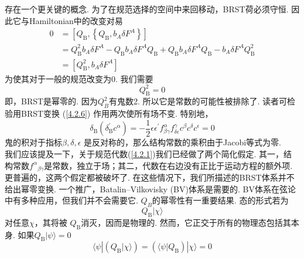 存在一个更关键的概念. 为了在规范选择的空间中来回移动，BRST荷必须守恒. 因此它与Hamiltonian中的改变对易                                                                                                                                                                                                                                                                                                                                         
\begin{equation}
\begin{aligned}
0 &=\left[Q_{\mathrm{B}},\left\{Q_{\mathrm{B}}, b_{A} \delta F^{A}\right\}\right] \\
&=Q_{\mathrm{B}}^{2} b_{A} \delta F^{A}-Q_{\mathrm{B}} b_{A} \delta F^{A} Q_{\mathrm{B}}+Q_{\mathrm{B}} b_{A} \delta F^{A} Q_{\mathrm{B}}-b_{A} \delta F^{A} Q_{\mathrm{B}}^{2} \\
&=\left[Q_{\mathrm{B}}^{2}, b_{A} \delta F^{A}\right]
\end{aligned}
\end{equation}
为使其对于一般的规范改变为0. 我们需要
\begin{equation}
Q_{\mathrm{B}}^{2}=0
\end{equation}
即，BRST是幂零的. 因为$Q_B^2$有鬼数2. 所以它是常数的可能性被排除了. 读者可检验用BRST变换 (\ref{4.2.6}) 作用两次使所有场不变. 特别地，                                                                         
\begin{equation}
\delta_{\mathrm{B}}\left(\delta_{\mathrm{B}}^{\prime} c^{\alpha}\right)=-\frac{1}{2} \epsilon \epsilon^{\prime} f_{\beta \gamma}^{\alpha} f_{\delta \epsilon}^{\gamma} c^{\beta} c^{\delta} c^{\epsilon}=0
\end{equation}
鬼的积对于指标$\beta, \delta, \epsilon$ 是反对称的，那么结构常数的乘积由于Jacobi等式为零.\\
我们应该提及一下，关于规范代数(\ref{4.2.1})我们已经做了两个简化假定. 其一，结构常数$f^{\alpha}{ }_{\beta \gamma}$是常数，独立于场；其二，代数在右边没有正比于运动方程的额外项. 更普遍的，这两个假定都被破坏了. 在这些情况下，我们所描述的BRST体系并不给出幂零变换. 一个推广，Batalin–Vilkovisky (BV)体系是需要的. BV体系在弦论中有多种应用，但我们并不会需要它. $Q_B$的幂零性有一重要结果. 态的形式若为
\begin{equation}\label{4.2.15}
Q_{\mathrm{B}}|\chi\rangle
\end{equation}
对任意$\chi$，其将被 $Q_{\mathrm{B}}$消灭，因而是物理的. 然而，它正交于所有的物理态包括其本身. 如果$Q_{\mathrm{B}}|\psi\rangle=0$
\begin{equation}
\langle\psi|\left(Q_{\mathrm{B}}|\chi\rangle\right)=\left(\langle\psi| Q_{\mathrm{B}}\right)|\chi\rangle=0
\end{equation}
